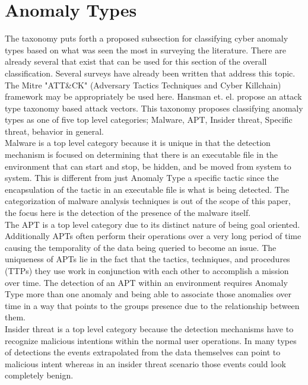 \documentclass[10pt]{IEEEtran}
\begin{document}
\section{Anomaly Types}
The taxonomy puts forth a proposed subsection for classifying cyber anomaly types based on what was seen the most in surveying the literature. There are already several that exist that can be used for this section of the overall classification. Several surveys have already been written that address this topic. The Mitre "ATT\&CK" (Adversary Tactics Techniques and Cyber Killchain) framework may be appropriately be used here\cite{lazarevic2005intrusion}\cite{mitchell2014survey}\cite{axelsson2000intrusion}. Hansman et. el. propose an attack type taxonomy based attack vectors\cite{hansman2005taxonomy}.
This taxonomy proposes classifying anomaly types as one of five top level categories; Malware, APT, Insider threat, Specific threat, behavior in general. \\
Malware is a top level category because it is unique in that the detection mechanism is focused on determining that there is an executable file in the environment that can start and stop, be hidden, and be moved from system to system. This is different from just Anomaly Type a specific tactic since the encapsulation of the tactic in an executable file is what is being detected. The categorization of malware analysis techniques is out of the scope of this paper, the focus here is the detection of the presence of the malware itself. \\
The APT is a top level category due to its distinct nature of being goal oriented. Additionally APTs often perform their operations over a very long period of time causing the temporality of the data being queried to become an issue.  The uniqueness of APTs lie in the fact that the tactics, techniques, and procedures (TTPs) they use work in conjunction with each other to accomplish a mission over time. The detection of an APT within an environment requires Anomaly Type more than one anomaly and being able to associate those anomalies over time in a way that points to the groups presence due to the relationship between them. \\
Insider threat is a top level category because the detection mechanisms have to recognize malicious intentions within the normal user operations. In many types of detections the events extrapolated from the data themselves can point to malicious intent whereas in an insider threat scenario those events could look completely benign.\\
\end{document}
